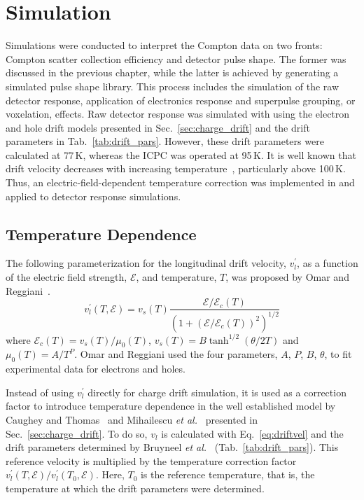 \chapter{Simulation}\label{chap:simulation}
Simulations were conducted to interpret the Compton data on two fronts: Compton scatter collection efficiency and detector pulse shape. The former was discussed in the previous chapter, while the latter is achieved by generating a simulated pulse shape library. This process includes the simulation of the raw detector response, application of electronics response and superpulse grouping, or voxelation, effects. Raw detector response was simulated with \SSD{} using the electron and hole drift models presented in Sec.~\ref{sec:charge_drift} and the drift parameters in Tab.~\ref{tab:drift_pars}. However, these drift parameters were calculated at 77\,K, whereas the ICPC was operated at 95\,K. It is well known that drift velocity decreases with increasing temperature~\cite{driftvelGe_temp}, particularly above 100\,K. Thus, an electric-field-dependent temperature correction was implemented in \SSD{} and applied to detector response simulations. 

\section{Temperature Dependence}
The following parameterization for the longitudinal drift velocity, $v^\prime_l$, as a function of the electric field strength, $\mathcal{E}$, and temperature, $T$, was proposed by Omar and Reggiani~\cite{drift_temp_dep}.
\begin{equation}
	v^\prime_l(T,\mathcal{E}) = v_s(T)\frac{\mathcal{E}/\mathcal{E}_c(T)}{(1 + (\mathcal{E}/\mathcal{E}_c(T))^2)^{1/2}} 
\end{equation}
where $\mathcal{E}_c(T) = v_s(T)/\mu_0(T)$, $v_s(T) = B\tanh^{1/2}(\theta/2T)$ and $\mu_0(T) = A/T^P$. Omar and Reggiani used the four parameters, $A$, $P$, $B$, $\theta$, to fit experimental data for electrons and holes. 

Instead of using $v^\prime_l$ directly for charge drift simulation, it is used as a correction factor to introduce temperature dependence in the well established model by Caughey and Thomas~\cite{drift_parametrization} and Mihailescu \textit{et al.}~\cite{Mihailescu2000} presented in Sec.~\ref{sec:charge_drift}. To do so, $v_l$ is calculated with Eq.~\ref{eq:driftvel} and the drift parameters determined by Bruyneel \textit{et al.}~\cite{drift_pars} (Tab.~\ref{tab:drift_pars}). This reference velocity is multiplied by the temperature correction factor $v^\prime_l(T,\mathcal{E})/v^\prime_l(T_0,\mathcal{E})$. Here, $T_0$ is the reference temperature, that is, the temperature at which the drift parameters were determined.


